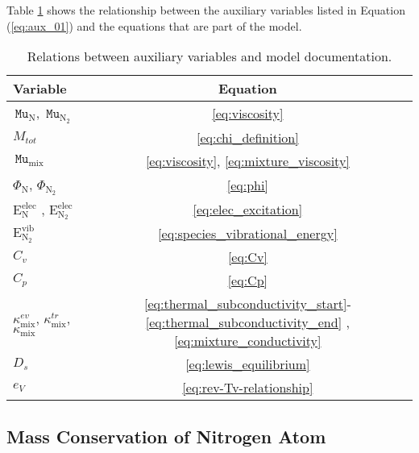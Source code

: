 \documentclass[10pt]{article}
\newcommand{\N}{\text{N}}
\newcommand{\elec}{\text{elec}}
\newcommand{\vib}{\text{vib}}
\newcommand{\E}{\text{E}}
\newcommand{\Mu}{\, \mathtt{Mu}}
\begin{document}
Table \ref{table_aux_var} shows the relationship between the auxiliary variables listed in Equation (\ref{eq:aux_01}) and the
equations that are part of the model.
\begin{table}[htb]
\caption{Relations between auxiliary variables and model documentation.}
\centering
\begin{tabular}{l c }
\hline\hline
     Variable    &  Equation  \\ [0.25ex]
\hline 
$\Mu_{\N}$, $\Mu_{\N_2}$   	&   \ref{eq:viscosity}      		\vspace{2pt} \\
$M_{tot} $    			&   \ref{eq:chi_definition} 		\vspace{2pt} \\
$\Mu_{\text{mix}}  $  		&   \ref{eq:viscosity}, \ref{eq:mixture_viscosity}           \vspace{2pt} \\
$\Phi_{\N} $, $\Phi_{\N_2}$    	&   \ref{eq:phi}             \vspace{2pt} \\ 
$\E_{\N}^{\elec} $ , $\E_{\N_2}^{\elec}$   &  \ref{eq:elec_excitation}              \vspace{2pt} \\
$\E_{\N_2}^{\vib} $   		&   \ref{eq:species_vibrational_energy}             \vspace{2pt} \\
$C_v $    			&   \ref{eq:Cv}             \vspace{2pt} \\
$C_p  $    			&   \ref{eq:Cp}             \vspace{2pt} \\
$\kappa^{ev}_{\text{mix}}$, $\kappa^{tr}_{\text{mix}}$, $\kappa_{\text{mix}} $    & 
\ref{eq:thermal_subconductivity_start}-\ref{eq:thermal_subconductivity_end}    ,\ref{eq:mixture_conductivity}         
\vspace{2pt} \\ 
$D_s $    			&  \ref{eq:lewis_equilibrium}              \vspace{2pt} \\
$e_V$				&  \ref{eq:rev-Tv-relationship}\vspace{2pt} \\
\hline
\end{tabular}
\label{table_aux_var}
\end{table}

\vfill

\subsection{Mass Conservation of Nitrogen Atom}
\end{document}
